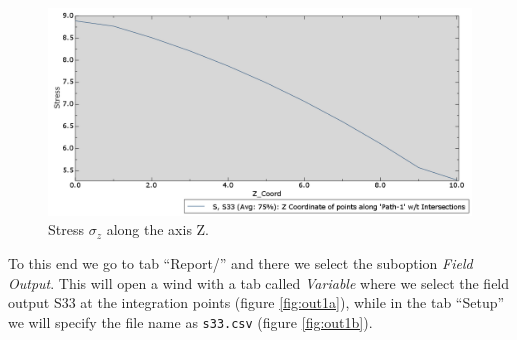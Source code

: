 \documentclass[spanish,a4paper,12pt]{article}
\begin{document}
\begin{figure}[h!tp]
\centering
\includegraphics[scale=0.45]{capturas/S-data.png}
\caption{Stress $\sigma_z$ along the axis Z.}
\label{fig:Data3}%
\end{figure}

To this end we go to tab ``Report/'' and there we select the suboption \emph{Field Output}. This will open a wind with a tab called \emph{Variable} where we select the field output S33 at the integration points (figure \ref{fig:out1a}), while in the tab ``Setup'' we will specify the file name as \texttt{s33.csv} (figure \ref{fig:out1b}).
\end{document}

